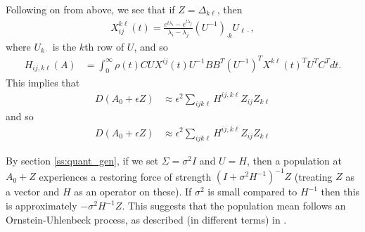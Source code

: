 \documentclass{article}
\newcommand{\1}{\mathbbm{1}}
\begin{document}
Following on from above, we see that if $Z=\Delta_{k \ell}$, then
\begin{equation}
  \begin{aligned}
      X_{ij}^{k\ell}(t) = 
      \frac{ e^{t \lambda_i} - e^{t \lambda_j} }{ \lambda_i - \lambda_j } 
      (U^{-1})_{\cdot k} U_{\ell \cdot},
  \end{aligned}
\end{equation}
where $U_{k \cdot}$ is the $k$th row of $U$,
and so
\begin{equation}
    \begin{aligned}
        H_{ij, k\ell}(A)
        &=
        \int_0^\infty
            \rho(t) C U X^{ij}(t) U^{-1} B B^T (U^{-1})^T X^{k\ell}(t)^T U^T C^T
        dt .
    \end{aligned}
\end{equation}
This implies that
\begin{equation}
    \begin{aligned}
        D(A_0+\epsilon Z)
        &\approx \epsilon^2\sum_{ijk\ell} H^{ij,k\ell} Z_{ij} Z_{k\ell} 
    \end{aligned}
\end{equation}
and so
\begin{equation}
    \begin{aligned}
        D(A_0+\epsilon Z)
        &\approx \epsilon^2\sum_{ijk\ell} H^{ij,k\ell} Z_{ij} Z_{k\ell} 
    \end{aligned}
\end{equation}

By section \ref{ss:quant_gen},
if we set $\Sigma=\sigma^2 I$ and $U=H$,
then a population at $A_0+Z$ experiences a restoring force of strength
$(I + \sigma^2 H^{-1})^{-1} Z$ (treating $Z$ as a vector and $H$ as an operator on these).
If $\sigma^2$ is small compared to $H^{-1}$
then this is approximately $-\sigma^2 H^{-1} Z$.
This suggests that the population mean follows an Ornstein-Uhlenbeck process,
as described (in different terms) in \citet{hansen1996translating}.
\end{document}
